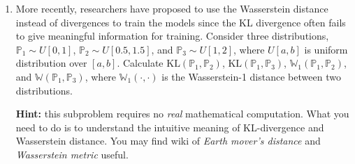 \begin{Q}
\begin{enumerate}
	\item More recently, researchers have proposed to use the Wasserstein distance instead of divergences to train the models since the KL divergence often fails to give meaningful information for training. Consider three distributions, $\mathbb{P}_1 \sim U[0, 1]$, $\mathbb{P}_2 \sim U[0.5, 1.5]$, and $\mathbb{P}_3 \sim U[1, 2]$, where $U[a, b]$ is uniform distribution over $[a, b]$. Calculate $\text{KL}(\mathbb{P}_1, \mathbb{P}_2)$, $\text{KL}(\mathbb{P}_1, \mathbb{P}_3)$, $\mathbb{W}_1 (\mathbb{P}_1, \mathbb{P}_2)$, and $\mathbb{W}(\mathbb{P}_1, \mathbb{P}_3)$, where $\mathbb{W}_1(\cdot, \cdot)$ is the Wasserstein-1 distance between two distributions.
	 
	\textbf{Hint:} this subproblem requires no \textit{real} mathematical computation. What you need to do is to understand the intuitive meaning of KL-divergence and Wasserstein distance. You may find wiki of \textit{Earth mover's distance} and \textit{Wasserstein metric} useful.
\end{enumerate}

\end{Q}
          

            